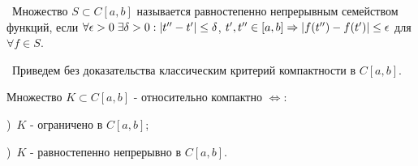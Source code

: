 \noindent\textasteriskcentered~Множество $S \subset C[a, b]$ называется равностепенно непрерывным семейством функций, если $\forall \epsilon > 0 \; \exists \delta > 0 : 
\left\lvert t'' - t'\right\rvert \le \delta$, $t', t'' \in [a, b] \Rightarrow \left\lvert f(t'') - f(t')\right\rvert \le \epsilon$ для $\forall f \in S$. 

\smallskip
\noindent\checkmark~Приведем без доказательства классическим критерий компактности в $C[a, b]$.

\begin{theorem*}
Множество $K \subset C[a,b]$ - относительно компактно $\Longleftrightarrow$:

\smallskip 
{})~$K$ - ограничено в $C[a, b]$;

\smallskip
{})~$K$ - равностепенно непрерывно в $C[a, b]$.
\end{theorem*}